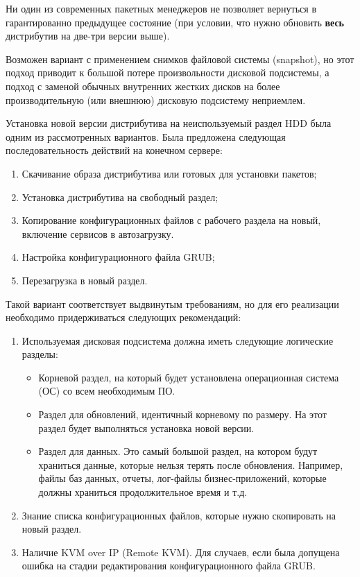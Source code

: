 \documentclass[10pt, a5paper]{article}
\begin{document}
Ни один из современных пакетных менеджеров не позволяет вернуться в гарантированно предыдущее состояние (при условии, что нужно обновить \textbf{весь} дистрибутив на две-три версии выше).

Возможен вариант с применением снимков файловой системы (snapshot), но этот подход приводит к большой потере произвольности дисковой подсистемы, а подход с заменой обычных внутренних жестких дисков на более производительную (или внешнюю) дисковую подсистему неприемлем.

Установка новой версии дистрибутива на неиспользуемый раздел HDD была одним из рассмотренных вариантов. Была предложена следующая последовательность действий на конечном сервере:

\begin{enumerate}
  \item Скачивание образа дистрибутива или готовых для установки пакетов;
  \item Установка дистрибутива на свободный раздел;
  \item Копирование конфигурационных файлов с рабочего раздела на новый, включение сервисов в автозагрузку.
  \item Настройка конфигурационного файла GRUB;
  \item Перезагрузка в новый раздел.
\end{enumerate}

Такой вариант соответствует выдвинутым требованиям, но для его реализации необходимо придерживаться следующих рекомендаций:

\begin{enumerate}
  \item Используемая дисковая подсистема должна иметь следующие логические разделы:\begin{itemize}
  \item Корневой раздел, на который будет установлена операционная система (ОС) со всем необходимым ПО.
  \item Раздел для обновлений, идентичный корневому по размеру. На этот раздел будет выполняться установка новой версии.
  \item Раздел для данных. Это самый большой раздел, на котором будут храниться данные, которые нельзя терять после обновления. Например, файлы баз данных, отчеты, лог-файлы бизнес-приложений, которые должны храниться продолжительное время и т.д.
\end{itemize}
  \item Знание списка конфигурационных файлов, которые нужно скопировать на новый раздел.
  \item Наличие KVM over IP (Remote KVM). Для случаев, если была допущена ошибка на стадии редактирования конфигурационного файла GRUB.
\end{enumerate}
\end{document}
